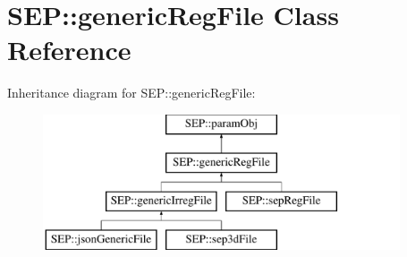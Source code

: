 \hypertarget{class_s_e_p_1_1generic_reg_file}{}\section{S\+EP\+:\+:generic\+Reg\+File Class Reference}
\label{class_s_e_p_1_1generic_reg_file}
Inheritance diagram for S\+EP\+:\+:generic\+Reg\+File\+:\begin{figure}[H]
\begin{center}
\leavevmode
\includegraphics[height=4.000000cm]{class_s_e_p_1_1generic_reg_file}
\end{center}
\end{figure}

